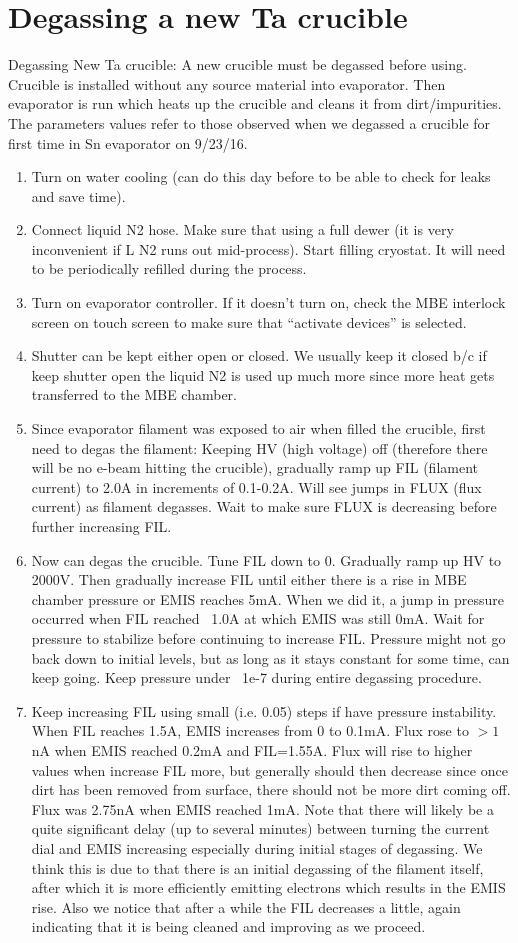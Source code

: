 \section{Degassing a new Ta crucible}
Degassing New Ta crucible:
A new crucible must be degassed before using. Crucible is installed without any source material into evaporator. Then evaporator is run which heats up the crucible and cleans it from dirt/impurities. The parameters values refer to those observed when we degassed a crucible for first time in Sn evaporator on 9/23/16.
\begin{enumerate}
\item	Turn on water cooling (can do this day before to be able to check for leaks and save time).
\item	Connect liquid N2 hose. Make sure that using a full dewer (it is very inconvenient if L N2 runs out mid-process). Start filling cryostat. It will need to be periodically refilled during the process.
\item	Turn on evaporator controller. If it doesn’t turn on, check the MBE interlock screen on touch screen to make sure that “activate devices” is selected.
\item	Shutter can be kept either open or closed. We usually keep it closed b/c if keep shutter open the liquid N2 is used up much more since more heat gets transferred to the MBE chamber.
\item	Since evaporator filament was exposed to air when filled the crucible, first need to degas the filament: Keeping HV (high voltage) off (therefore there will be no e-beam hitting the crucible), gradually ramp up FIL (filament current) to 2.0A in increments of 0.1-0.2A. Will see jumps in FLUX (flux current) as filament degasses. Wait to make sure FLUX is decreasing before further increasing FIL.
\item	Now can degas the crucible. Tune FIL down to 0. Gradually ramp up HV to 2000V. Then gradually increase FIL until either there is a rise in MBE chamber pressure or EMIS reaches 5mA. When we did it, a jump in pressure occurred when FIL reached ~1.0A at which EMIS was still 0mA. Wait for pressure to stabilize before continuing to increase FIL. Pressure might not go back down to initial levels, but as long as it stays constant for some time, can keep going. Keep pressure under ~1e-7 during entire degassing procedure. 
\item	Keep increasing FIL using small (i.e. 0.05) steps if have pressure instability. When FIL reaches 1.5A, EMIS increases from 0 to 0.1mA. Flux rose to $>1$nA when EMIS reached 0.2mA and FIL=1.55A. Flux will rise to higher values when increase FIL more, but generally should then decrease since once dirt has been removed from surface, there should not be more dirt coming off. Flux was 2.75nA when EMIS reached 1mA. Note that there will likely be a quite significant delay (up to several minutes) between turning the current dial and EMIS increasing especially during initial stages of degassing. We think this is due to that there is an initial degassing of the filament itself, after which it is more efficiently emitting electrons which results in the EMIS rise. Also we notice that after a while the FIL decreases a little, again indicating that it is being cleaned and improving as we proceed.

\end{enumerate}
